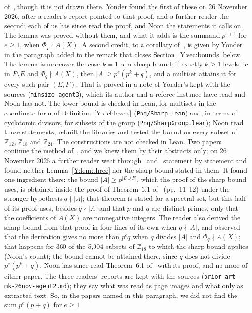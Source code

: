 \documentclass[11pt,a4paper]{amsart}
\theoremstyle{definition}
\theoremstyle{remark}
\newcommand{\Z}{\mathbb{Z}}
\newcommand{\lean}[1]{\texttt{#1}}
\begin{document}
of~\cite{MK}, though it is not drawn there. Yonder found the first of these on 26 November 2026, after a reader's
report pointed to that proof, and a further reader the second; each of us has since read the proof, and Noon the statements it
calls on. The lemma was proved without them, and what it adds is the summand $p^{e+1}$ for $e\ge1$, when
$\Phi_q\nmid A(X)$. A second credit, to a corollary of~\cite{LaM}, is given by Yonder in the paragraph added to the
remark that closes Section~\ref{Y:sec:bounds} below. The lemma is moreover the case $k=1$ of a sharp bound: if exactly $k\ge1$
levels lie in $F\setminus E$ and $\Phi_q\nmid A(X)$, then $|A|\ge p^{e}(p^k+q)$, and a multiset attains it for
every such pair $(E,F)$. That is proved in a note of Yonder's kept with the sources
(\texttt{minsize-agent3}), which its author and a referee instance have read and Noon has not. The lower bound is
checked in Lean, for multisets in the coordinate form of Definition~\ref{Y:def:levels} (\lean{Pnq/Sharp.lean}) and, in
terms of cyclotomic divisors, for subsets of the group (\lean{Pnq/SharpGroup.lean}); Noon read those statements, rebuilt the libraries and tested the bound
on every subset of $\Z_{12}$, $\Z_{18}$ and $\Z_{24}$. The constructions are not checked in Lean. Two papers continue the method of~\cite{MK}, and we
knew them by their abstracts only; on 26 November 2026 a further reader went through~\cite{Mal} and~\cite{KMSV}
statement by statement and found neither Lemma~\ref{Y:lem:three} nor the sharp bound stated in them. It found one
ingredient there: the bound $|A|\ge p^{|E\cup F|}$, which the proof of the sharp bound uses, is obtained inside the
proof of Theorem~6.1 of~\cite{Mal} (pp.~11--12) under the stronger hypothesis $q\nmid|A|$; that theorem is stated for
a spectral set, but this half of its proof uses, besides $q\nmid|A|$ and that $p$ and $q$ are distinct primes, only that the coefficients of $A(X)$ are nonnegative integers. The reader also
derived the sharp bound from that proof in four lines of its own when $q\nmid|A|$, and observed that the derivation
gives no more than $p^eq$ when $q$ divides $|A|$ and $\Phi_q\nmid A(X)$; that happens for 360 of the 5{,}904 subsets
of $\Z_{18}$ to which the sharp bound applies (Noon's count); the bound cannot be attained there, since $q$ does not divide $p^e(p^k+q)$. Noon has since read Theorem~6.1 of~\cite{Mal} with its proof, and
no more of either paper. The three readers' reports are kept with the sources (\texttt{prior-art-mk-26nov-agent2.md});
they say what was read as page images and what only as extracted text. So, in the papers named in this paragraph, we did not find the sum $p^e(p+q)$ for $e\ge1$
\end{document}
